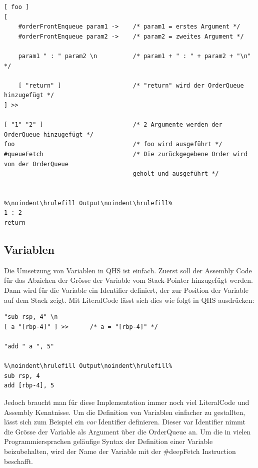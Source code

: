 \begin{lstlisting}[language=QHS, caption=Verwendung von Parametern und Rückgabewert eines Identifiers]
[ foo ]
[
    #orderFrontEnqueue param1 ->    /* param1 = erstes Argument */
    #orderFrontEnqueue param2 ->    /* param2 = zweites Argument */

    param1 " : " param2 \n          /* param1 + " : " + param2 + "\n" */

    [ "return" ]                    /* "return" wird der OrderQueue hinzugefügt */
] >>

[ "1" "2" ]                         /* 2 Argumente werden der OrderQueue hinzugefügt */
foo                                 /* foo wird ausgeführt */
#queueFetch                         /* Die zurückgegebene Order wird von der OrderQueue
                                    geholt und ausgeführt */


%\noindent\hrulefill Output\noindent\hrulefill%
1 : 2
return
\end{lstlisting}


\subsection{Variablen} \label{sec:qhs-vars}
Die Umsetzung von Variablen in QHS ist einfach. Zuerst soll der Assembly Code für das Abziehen der Grösse der Variable vom Stack-Pointer hinzugefügt werden.
Dann wird für die Variable ein Identifier definiert, der zur Position der Variable auf dem Stack zeigt.
Mit LiteralCode lässt sich dies wie folgt in QHS ausdrücken:

\begin{lstlisting}[language=QHS, caption=Definition einer Variable mit LiteralCode]
"sub rsp, 4" \n
[ a "[rbp-4]" ] >>      /* a = "[rbp-4]" */

"add " a ", 5"

%\noindent\hrulefill Output\noindent\hrulefill%
sub rsp, 4
add [rbp-4], 5
\end{lstlisting}

Jedoch braucht man für diese Implementation immer noch viel LiteralCode und Assembly Kenntnisse. Um die Definition von Variablen einfacher zu gestallten, lässt sich zum Beispiel ein \textit{var} Identifier definieren.
Dieser var Identifier nimmt die Grösse der Variable als Argument über die OrderQueue an. Um die in vielen Programmiersprachen geläufige Syntax der Definition einer Variable beizubehalten,
wird der Name der Variable mit der \#deepFetch Instruction beschafft.

